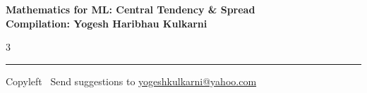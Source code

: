 \documentclass[8pt,landscape]{article}
\begin{document}
\footnotesize


\begin{center}
\Large{\textbf{Mathematics for ML: Central Tendency \& Spread\\ Compilation: Yogesh Haribhau Kulkarni}}
\end{center}

\begin{multicols}{3}

\end{multicols}

\rule{\linewidth}{0.25pt}
\scriptsize
Copyleft \textcopyleft\  Send suggestions to
\href{http://www.yogeshkulkarni.com}{yogeshkulkarni@yahoo.com}
\end{document}
